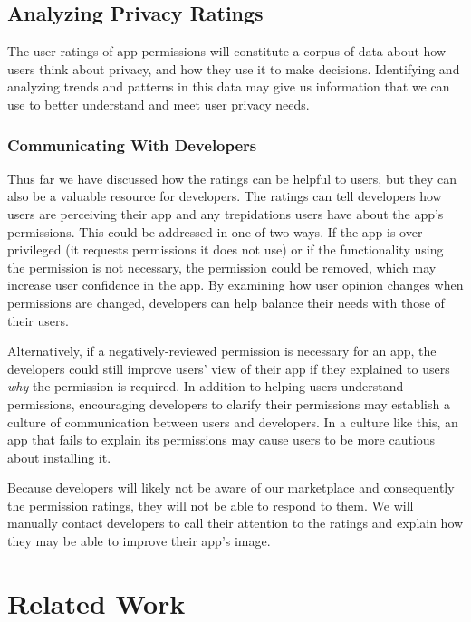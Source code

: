 \documentclass[11pt]{article}
\begin{document}
\subsection{Analyzing Privacy Ratings}
\label{subsec-analyzing-ratings}

The user ratings of app permissions will constitute a corpus of 
data about how users think about privacy, and how they use it to make decisions.
Identifying and analyzing trends and patterns in this data may give us 
information that we can use to better understand and meet user privacy needs.

\subsubsection{Communicating With Developers}
\label{subsubsec-dev-comm}

Thus far we have discussed how the ratings can be helpful to users, but
they can also be a valuable resource for developers. The ratings can tell
developers how users are perceiving their app and any trepidations users
have about the app's permissions. This could be addressed in one of two 
ways. If the app is over-privileged (it requests permissions it does not
use) or if the functionality using the permission is not necessary, the
permission could be removed, which may increase user confidence in the 
app. By examining how user opinion changes when permissions are changed,
developers can help balance their needs with those of their users. 

Alternatively, if a negatively-reviewed permission is necessary for
an app, the developers could still improve users' view of their app
if they explained to users \emph{why} the permission is required. In 
addition to helping users understand permissions, encouraging developers 
to clarify their permissions may establish a culture of communication
between users and developers. In a culture like this, an app that fails
to explain its permissions may cause users to be more cautious about 
installing it. 

Because developers will likely not be aware of our marketplace and 
consequently the permission ratings, they will not be able to respond 
to them. We will manually contact developers to call their attention
to the ratings and explain how they may be able to improve their 
app's image.


\section{Related Work}
\end{document}
